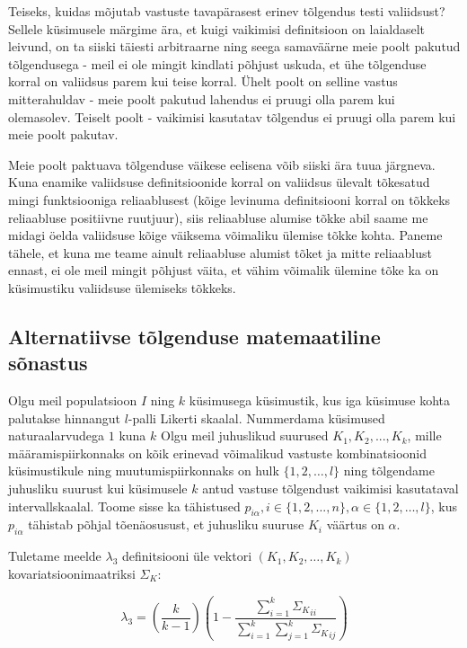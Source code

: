 \documentclass[a4paper,12pt,oneside]{article}
\numberwithin{equation}{section}
\theoremstyle{definition}
\begin{document}
Teiseks, kuidas mõjutab vastuste tavapärasest erinev tõlgendus testi valiidsust? Sellele küsimusele märgime ära, et kuigi vaikimisi definitsioon on laialdaselt leivund, on ta siiski täiesti arbitraarne ning seega samaväärne meie poolt pakutud tõlgendusega - meil ei ole mingit kindlati põhjust uskuda, et ühe tõlgenduse korral on valiidsus parem kui teise korral. Ühelt poolt on selline vastus mitterahuldav - meie poolt pakutud lahendus ei pruugi olla parem kui olemasolev. Teiselt poolt - vaikimisi kasutatav tõlgendus ei pruugi olla parem kui meie poolt pakutav. 

Meie poolt paktuava tõlgenduse väikese eelisena võib siiski ära tuua järgneva. 
Kuna enamike valiidsuse definitsioonide korral on valiidsus ülevalt tõkesatud mingi funktsiooniga reliaablusest (kõige levinuma definitsiooni korral on tõkkeks reliaabluse positiivne ruutjuur), siis reliaabluse alumise tõkke abil saame me midagi öelda valiidsuse kõige väiksema võimaliku ülemise tõkke kohta. Paneme tähele, et kuna me teame ainult reliaabluse alumist tõket ja mitte reliaablust ennast, ei ole meil mingit põhjust väita, et vähim võimalik ülemine tõke ka on küsimustiku valiidsuse ülemiseks tõkkeks.
 

\subsection{Alternatiivse tõlgenduse matemaatiline sõnastus}


Olgu meil populatsioon $I$ ning $k$ küsimusega küsimustik, kus iga küsimuse kohta palutakse hinnangut $l$-palli Likerti skaalal. Nummerdama küsimused naturaalarvudega $1$ kuna $k$ Olgu meil juhuslikud suurused $K_1,K_2,...,K_k$, mille määramispiirkonnaks on kõik erinevad võimalikud vastuste kombinatsioonid küsimustikule ning muutumispiirkonnaks on hulk $\lbrace 1,2,\ldots,l \rbrace$ ning tõlgendame juhusliku suurust kui küsimusele $k$ antud vastuse tõlgendust vaikimisi kasutataval intervallskaalal.  Toome sisse ka tähistused $p_{i \alpha}, i \in \{1,2,...,n\}, \alpha \in \lbrace 1,2,\ldots,l \rbrace $, kus $p_{i \alpha}$ tähistab põhjal tõenäosusust, et juhusliku suuruse $K_i$ väärtus on $\alpha$. 

Tuletame meelde $\lambda_3$ definitsiooni üle vektori $\left( K_1, K_2, \ldots,K_k \right)$ kovariatsioonimaatriksi $\Sigma_K$: 

\begin{equation*}
\lambda_3 = (\frac{k}{k-1})( 1 - \frac{\sum \limits_{i=1}^k {\Sigma_K}_{ii} }{ \sum \limits_{i=1}^k \sum \limits_{j=1}^k {\Sigma_K}_{ij}})
\end{equation*}
\end{document}
